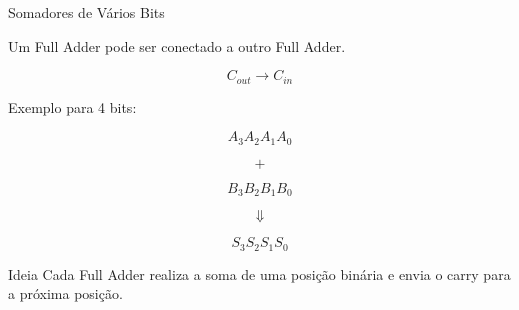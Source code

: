 \begin{frame}{Somadores de Vários Bits}

    Um Full Adder pode ser conectado a outro Full Adder.

    \[
        C_{out}
        \longrightarrow
        C_{in}
    \]

    \vspace{0.4cm}

    Exemplo para 4 bits:

    \[
        A_3A_2A_1A_0
    \]

    \[
        +
    \]

    \[
        B_3B_2B_1B_0
    \]

    \[
        \Downarrow
    \]

    \[
        S_3S_2S_1S_0
    \]

    \begin{alertblock}{Ideia}
        Cada Full Adder realiza a soma de uma posição binária e
        envia o carry para a próxima posição.
    \end{alertblock}

\end{frame}